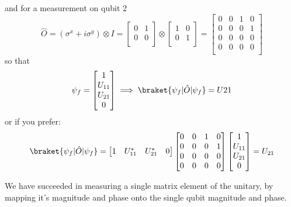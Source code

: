 and for a measurement on qubit 2
\begin{equation}
    \hat{O}=(\sigma^{x} + i\sigma^{y}) \otimes I=
    \begin{bmatrix}
        0 & 1\\
        0 & 0\\
    \end{bmatrix}
    \otimes
    \begin{bmatrix}
        1 & 0\\
        0 & 1\\
    \end{bmatrix}
    =
    \begin{bmatrix}
        0 & 0 & 1 & 0\\
        0 & 0 & 0 & 1\\
        0 & 0 & 0 & 0\\
        0 & 0 & 0 & 0\\
    \end{bmatrix}
\end{equation}
so that
\begin{equation}
    \psi_{f}=
    \begin{bmatrix}
        1 \\
        U_{11} \\
        U_{21} \\
        0 \\
    \end{bmatrix}
    \implies
    \braket{\psi_{f}|\hat{O}|\psi_{f}} = U21
\end{equation}
or if you prefer:
\begin{equation}
    \braket{\psi_{f}|\hat{O}|\psi_{f}} =
    \begin{bmatrix}
        1 & U_{11}^{*} & U_{21}^{*} & 0
    \end{bmatrix}
    \begin{bmatrix}
        0 & 0 & 1 & 0\\
        0 & 0 & 0 & 1\\
        0 & 0 & 0 & 0\\
        0 & 0 & 0 & 0\\
    \end{bmatrix}
    \begin{bmatrix}
        1 \\
        U_{11} \\
        U_{21} \\
        0 \\
    \end{bmatrix}
    = U_{21}
\end{equation}

We have succeeded in measuring a single matrix element of the unitary, by mapping it's magnitude and phase onto the single qubit magnitude and phase.


